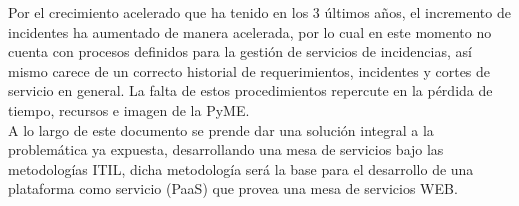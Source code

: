 Por el crecimiento acelerado que ha tenido en los 3 últimos años, el incremento de incidentes ha aumentado de manera acelerada, por lo cual en este momento no cuenta con procesos definidos para la gestión de servicios de incidencias, así mismo carece de un correcto historial de requerimientos, incidentes y cortes de servicio en general. La falta de estos procedimientos repercute en la pérdida de tiempo, recursos e imagen de la PyME.\\

A lo largo de este documento se prende dar una solución integral a la problemática ya expuesta, desarrollando una mesa de servicios bajo las metodologías ITIL, dicha metodología será la base para el desarrollo de una plataforma como servicio (PaaS) que provea una mesa de servicios WEB.
\newpage
